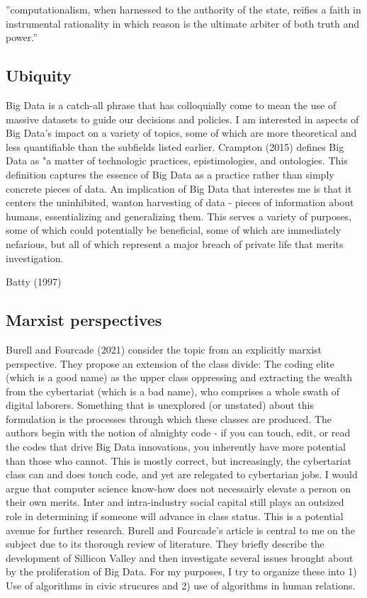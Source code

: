 ''computationalism, when harnessed to the authority of the state,
reifies a faith in instrumental rationality in which reason is the
ultimate arbiter of both truth and power.''

\subsection{Ubiquity}
Big Data is a catch-all phrase that has colloquially come to mean the
use of massive datasets to guide our decisions and policies. I am
interested in aspects of Big Data's impact on a variety of topics,
some of which are more theoretical and less quantifiable than the
subfields listed earlier. Crampton (2015) defines Big Data as "a
matter of technologic practices, epistimologies, and ontologies. This
definition captures the essence of Big Data as a practice rather than
simply concrete pieces of data. An implication of Big Data that
interestes me is that it centers the uninhibited, wanton harvesting of
data - pieces of information about humans, essentializing and
generalizing them. This serves a variety of purposes, some of which
could potentially be beneficial, some of which are immediately
nefarious, but all of which represent a major breach of private life
that merits investigation.

Batty (1997)


\subsection{Marxist perspectives}
Burell and Fourcade (2021) consider the topic from an explicitly
marxist perspective. They propose an extension of the class divide:
The coding elite (which is a good name) as the upper class oppressing
and extracting the wealth from the cybertariat (which is a bad name),
who comprises a whole swath of digital laborers. Something that is
unexplored (or unstated) about this formulation is the processes
through which these classes are produced. The authors begin with the
notion of almighty code - if you can touch, edit, or read the codes
that drive Big Data innovations, you inherently have more potential
than those who cannot. This is mostly correct, but increasingly, the
cybertariat class can and does touch code, and yet are relegated to
cybertarian jobs. I would argue that computer science know-how does
not necessairly elevate a person on their own merits. Inter and
intra-industry social capital still plays an outsized role in
determining if someone will advance in class status. This is a
potential avenue for further research.  Burell and Fourcade's article
is central to me on the subject due to its thorough review of
literature. They briefly describe the development of Sillicon Valley
and then investigate several issues brought about by the proliferation
of Big Data. For my purposes, I try to organize these into 1) Use of
algorithms in civic strucures and 2) use of algorithms in human
relations.

